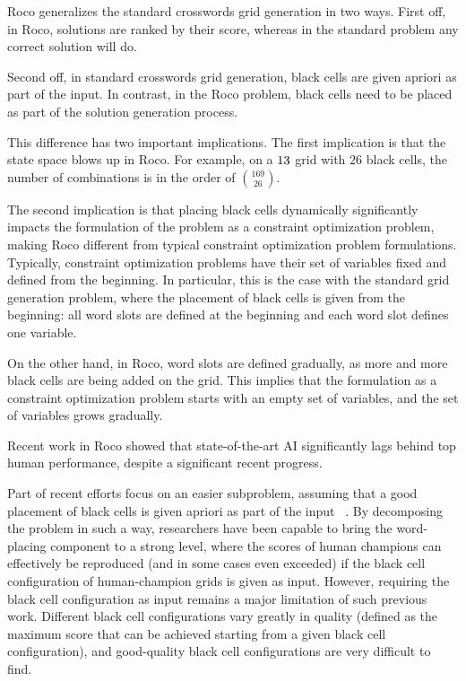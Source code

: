{\sc Roco} generalizes the standard crosswords grid generation in two ways.
First off, in {\sc Roco}, solutions are ranked by their score,
whereas in the standard problem any correct solution will do.

Second off, in 
standard crosswords grid generation, black cells are given apriori as part of the input.
In contrast, in the {\sc Roco} problem,
black cells need to be placed as part of the solution generation process.

This difference has two important implications.
The first implication is that the state space blows up in {\sc Roco}. 
For example, on a $13 \time 13$ grid with $26$ black cells,
the number of combinations is in the order of $169 \choose 26$.

The second implication is that placing black cells dynamically significantly impacts 
the formulation of the problem as a constraint optimization problem, making 
{\sc Roco} different from typical constraint optimization problem formulations.
Typically, constraint optimization problems have their set of variables fixed
and defined from the beginning.
In particular, this is the case with the standard grid generation problem,
where the placement of black cells is given from the beginning:
all word slots are defined at the beginning and each word slot defines one variable.

On the other hand, in {\sc Roco}, word slots are defined gradually, 
as more and more black cells are being added on the grid.
This implies that the formulation as a constraint optimization problem
starts with an empty set of variables, and the set of variables grows gradually.


Recent work in {\sc Roco} showed that state-of-the-art AI significantly lags behind
top human performance, despite a significant recent progress.

Part of recent efforts focus on an easier subproblem, assuming that
a good placement of black cells is given apriori as part of the input
~\cite{DBLP:conf/socs/BoteaB21,Botea_Bulitko_2022}.
By decomposing the problem in such a way, researchers have been capable
to bring the word-placing component to a strong level,
where the scores of human champions can effectively be reproduced (and in some
cases even exceeded) if the black cell configuration of human-champion grids
is given as input.
However, requiring the black cell configuration as input remains a major limitation
of such previous work. Different black cell configurations vary greatly in quality
(defined as the maximum score that can be achieved
starting from a given black cell configuration),
and good-quality black cell configurations are very difficult to find.


